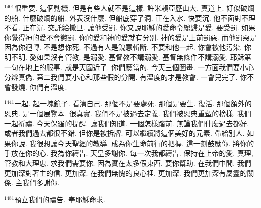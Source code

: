 \documentclass{book}
\begin{document}
$^{1401}$很重要.
這個動機.
但是有些人就不是這樣.
許米賴亞歷山大.
真道上.
好似破爛的船.
什麼破爛的船.
外表沒什麼.
但船底穿了洞.
正在入水.
快要沉.
他不面對不理不看.
正在沉.
交託給撒旦.
讓他受罰.
你又說耶穌的愛命令總歸是愛.
要受罰.
如果你覺得神的愛不會懲罰.
你的愛和神的愛就有分別.
神的愛是上前罰惡.
而他罰惡是因為你迴轉.
不是想你死.
不過有人是銳意斬斷.
不要和他一起.
你會被他污染.
你明不明.
愛如果沒有管教.
是溺愛.
基督教不講溺愛.
基督無條件不講溺愛.
耶穌第一句在地上的服事.
就是天國近了.
你們應當的.
今天三個圖畫.
一方面我們要小心分辨真偽.
第二我們要小心和那些假的分開.
有溫度的才是教會.
一會兒完了.
你不會發燒.
你們有溫度.

$^{1441}$一起.
起一塊鏡子.
看清自己.
那個不是要處死.
那個是要生.
復活.
那個額外的恩典.
是一個展覽本.
很真實.
我們不是被過去定義.
我們被恩典重塑的榜樣.
我們一起祈禱.
今天保羅的提醒.
讓我們知道.
一個怎樣踏前.
無論我們什麼過去都好.
或者我們過去都很不錯.
但你是被拆牌.
可以繼續將這個美好的元素.
帶給別人.
如果你說.
我很想讓今天聖經的教導.
成為你生命前行的把握.
這一刻鼓勵你.
將你的手放在你的心.
我為你禱告.
天皇多謝你.
每一次我都禱告.
保持在上帝的愛.
真理,管教和大理忠.
求我們需要你.
因為實在太多假東西.
要你幫助.
在我們中間.
我們更加深對著主的信.
更加深.
在我們無愧的良心裡.
更加深.
我們更加深有屬靈的關係.
主我們多謝你.

$^{1481}$預立我們的禱告.
奉耶穌命求.
\newpage
\end{document}

